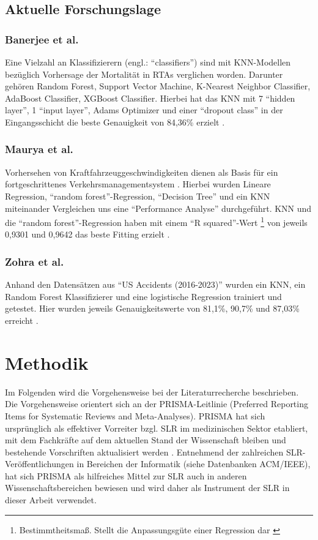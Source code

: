 \documentclass{scrartcl}
\begin{document}
\subsection{Aktuelle Forschungslage}

\subsubsection{Banerjee et al.}
Eine Vielzahl an Klassifizierern (engl.: \enquote{classifiers}) sind mit
KNN-Modellen bezüglich Vorhersage der Mortalität in RTAs verglichen worden.
Darunter gehören
Random Forest, Support Vector Machine, K-Nearest Neighbor Classifier,
AdaBoost Classifier, XGBoost Classifier. Hierbei hat das KNN mit 7
\enquote{hidden layer}, 1 \enquote{input layer}, Adams Optimizer und einer
\enquote{dropout class} in der Eingangsschicht die beste Genauigkeit von 84,36\%
erzielt \cite{akt1}.

\subsubsection{Maurya et al.}
Vorhersehen von Kraftfahrzeuggeschwindigkeiten dienen als Basis für ein
fortgeschrittenes Verkehrsmanagementsystem \cite{akt2}. Hierbei wurden
Lineare Regression, \enquote{random forest}-Regression, \enquote{Decision Tree} und
ein KNN miteinander Vergleichen uns eine \enquote{Performance Analyse} durchgeführt.
KNN und die \enquote{random forest}-Regression haben mit einem
\enquote{R squared}-Wert \footnote{Bestimmtheitsmaß.
   Stellt die Anpassungsgüte einer Regression dar \cite{rsquared}}
von jeweils 0,9301 und 0,9642 das beste Fitting erzielt \cite{akt2}.

\subsubsection{Zohra et al.}
Anhand den Datensätzen aus \enquote{US Accidents (2016-2023)} wurden ein KNN,
ein Random Forest Klassifizierer und eine logistische Regression trainiert und
getestet. Hier wurden jeweils Genauigkeitswerte von 81,1\%, 90,7\% und 87,03\%
erreicht \cite{akt3}.

\section{Methodik}
Im Folgenden wird die Vorgehensweise bei der Literaturrecherche beschrieben.
Die Vorgehensweise orientert sich an der PRISMA-Leitlinie (Preferred Reporting
Items for Systematic Reviews and Meta-Analyses). PRISMA hat sich ursprünglich
als effektiver Vorreiter bzgl. SLR im medizinischen Sektor etabliert, mit dem
Fachkräfte auf dem aktuellen Stand der Wissenschaft bleiben und bestehende
Vorschriften aktualisiert werden \cite{prisma}. Entnehmend der zahlreichen
SLR-Veröffentlichungen in Bereichen der Informatik (siehe Datenbanken ACM/IEEE),
hat sich PRISMA als hilfreiches Mittel zur SLR auch in anderen
Wissenschaftsbereichen bewiesen und wird daher als Instrument der SLR
in dieser Arbeit verwendet.
\end{document}
